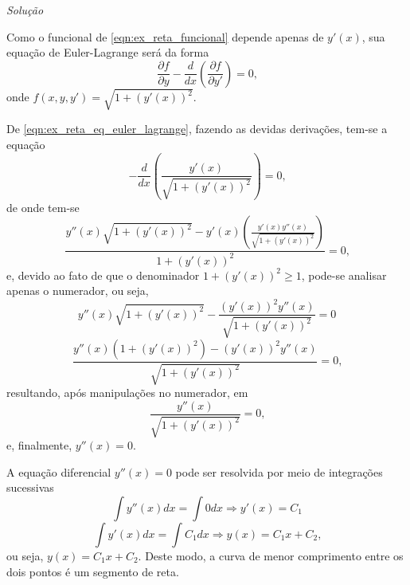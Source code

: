 \documentclass[
	12pt,				%
	openright,			%
    twoside,			%
	a4paper,			%
	english,			%
	french,				%
	spanish,			%
	brazil				%
	]{abntex2}
\makeatletter
\renewenvironment{proof}[1][\proofname]{
	\par\pushQED{\qed}%
	\normalfont \topsep6\p@\@plus6\p@\relax
	\trivlist
	\item\relax
		{\itshape
			#1\@addpunct{.}}\hspace\labelsep\ignorespaces
}{%
	\popQED\endtrivlist\@endpefalse
}
\newenvironment{solution}{
	\begin{proof}[Solução]
}{%
	\end{proof}
}
\numberwithin{lema}{chapter}
\numberwithin{teorema}{chapter}
\numberwithin{definicao}{chapter}
\numberwithin{exemplo}{chapter}
\numberwithin{figure}{chapter}
\makeatother
\begin{document}
\begin{solution}
	Como o funcional de \eqref{eqn:ex_reta_funcional} depende apenas de $y'(x)$, sua equação de Euler-Lagrange será da forma
	\begin{equation}
		\label{eqn:ex_reta_eq_euler_lagrange}
		\frac{\partial f}{\partial y}
		-
		\frac{d}{dx} \left (
			\frac{\partial f}{\partial y'}
		\right )
		= 0
		\text{,}
	\end{equation}
	onde $f(x, y, y')=\sqrt{1+(y'(x))^2}$.
	
	De \eqref{eqn:ex_reta_eq_euler_lagrange}, fazendo as devidas derivações, tem-se a equação
	\begin{equation}
		\label{eqn:ex_reta_prim_deriv}
		-\frac{d}{dx} \left (
			\frac{y'(x)}{\sqrt{1+(y'(x))^2}}
		\right )
		= 0
		\text{,}
	\end{equation}
	de onde tem-se
	$$
		\frac{
			y''(x)\sqrt{1+(y'(x))^2}
			-
			y'(x)\left (
				\frac{y'(x)y''(x)}{\sqrt{1+(y'(x))^2}}
			\right )
		}{
			1+(y'(x))^2
		}
		=0\text{,}
	$$
	e, devido ao fato de que o denominador $1+(y'(x))^2\geqslant 1$, pode-se analisar apenas o numerador, ou seja,
	$$
		y''(x)\sqrt{1+(y'(x))^2}
		-
		\frac{(y'(x))^2 y''(x)}{
			\sqrt{1+(y'(x))^2}
		}
		= 0
	$$
	$$
		\frac{
			y''(x)(1+(y'(x))^2)-(y'(x))^2y''(x)
		}{
			\sqrt{1+(y'(x))^2}
		}
		= 0
		\text{,}
	$$
	resultando, após manipulações no numerador, em
	$$
		\frac{y''(x)}{
			\sqrt{1+(y'(x))^2}
		}
		= 0
		\text{,}
	$$
	e, finalmente, $y''(x)=0$.
	
	A equação diferencial $y''(x)=0$ pode ser resolvida por meio de integrações sucessivas
	$$
		\int y''(x)dx = \int 0 dx \Longrightarrow y'(x) = C_1
	$$
	$$
		\int y'(x)dx = \int C_1 dx \Longrightarrow y(x) = C_1 x + C_2
		\text{,}
	$$
	ou seja, $y(x)=C_1x+C_2$. Deste modo, a curva de menor comprimento entre os dois pontos é um segmento de reta.
\end{solution}
\end{document}
